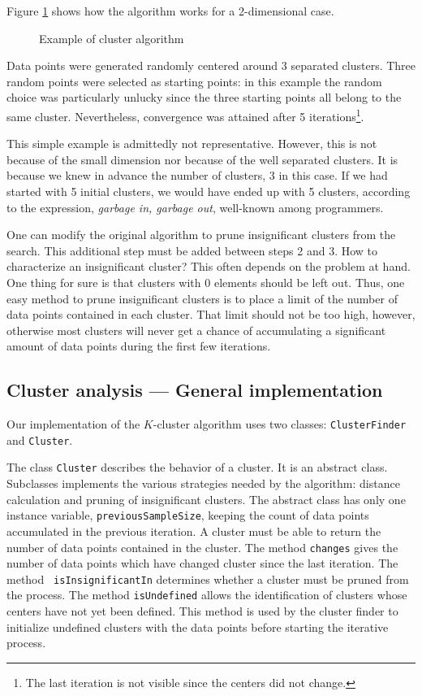 \documentclass[twoside]{book}
\begin{document}
Figure \ref{fig:clustersteps} shows how the algorithm works for a
2-dimensional case.
\begin{figure}
\center{}
\caption{Example of cluster algorithm}\label{fig:clustersteps}
\end{figure}
Data points were generated randomly centered around 3 separated
clusters. Three random points were selected as starting points: in
this example the random choice was particularly unlucky since the
three starting points all belong to the same cluster.
Nevertheless, convergence was attained after 5
iterations\footnote{The last iteration is not visible since the
centers did not change.}.

 This simple example is admittedly not
representative. However, this is not because of the small
dimension nor because of the well separated clusters. It is
because we knew in advance the number of clusters, 3 in this case.
If we had started with 5 initial clusters, we would have ended up
with 5 clusters, according to the expression, {\sl garbage in,
garbage out}, well-known among programmers.

One can modify the original algorithm to prune insignificant
clusters from the search. This additional step must be added
between steps 2 and 3. How to characterize an insignificant
cluster? This often depends on the problem at hand. One thing for
sure is that clusters with 0 elements should be left out. Thus,
one easy method to prune insignificant clusters is to place a
limit of the number of data points contained in each cluster. That
limit should not be too high, however, otherwise most clusters
will never get a chance of accumulating a significant amount of
data points during the first few iterations.

\subsection{Cluster analysis --- General implementation}
 Our implementation of
the $K$-cluster algorithm uses two classes: {\tt ClusterFinder}
and {\tt Cluster}.

The class {\tt Cluster} describes the behavior of a cluster. It is
an abstract class. Subclasses implements the various strategies
needed by the algorithm: distance calculation and pruning of
insignificant clusters. The abstract class has only one instance
variable, {\tt previousSampleSize}, keeping the count of data
points accumulated in the previous iteration. A cluster must be
able to return the number of data points contained in the cluster.
The method {\tt changes} gives the number of data points which
have changed cluster since the last iteration. The method {\tt
isInsignificantIn} determines whether a cluster must be pruned
from the process. The method {\tt isUndefined} allows the
identification of clusters whose centers have not yet been
defined. This method is used by the cluster finder to initialize
undefined clusters with the data points before starting the
iterative process.
\end{document}
